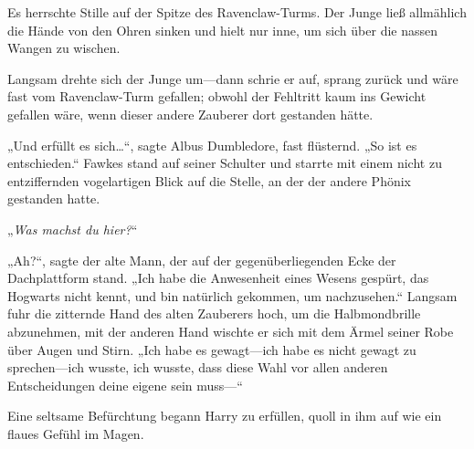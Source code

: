 Es herrschte Stille auf der Spitze des Ravenclaw-Turms. Der Junge ließ allmählich die Hände von den Ohren sinken und hielt nur inne, um sich über die nassen Wangen zu wischen.

Langsam drehte sich der Junge um—dann schrie er auf, sprang zurück und wäre fast vom Ravenclaw-Turm gefallen; obwohl der Fehltritt kaum ins Gewicht gefallen wäre, wenn dieser andere Zauberer dort gestanden hätte.

„Und erfüllt es sich…“, sagte Albus Dumbledore, fast flüsternd. „So ist es entschieden.“
Fawkes stand auf seiner Schulter und starrte mit einem nicht zu entziffernden vogelartigen Blick auf die Stelle, an der der andere Phönix gestanden hatte.

„\emph{Was machst du hier?}“

„Ah?“, sagte der alte Mann, der auf der gegenüberliegenden Ecke der Dachplattform stand. „Ich habe die Anwesenheit eines Wesens gespürt, das Hogwarts nicht kennt, und bin natürlich gekommen, um nachzusehen.“
Langsam fuhr die zitternde Hand des alten Zauberers hoch, um die Halbmondbrille abzunehmen, mit der anderen Hand wischte er sich mit dem Ärmel seiner Robe über Augen und Stirn.
„Ich habe es gewagt—ich habe es nicht gewagt zu sprechen—ich wusste, ich wusste, dass diese Wahl vor allen anderen Entscheidungen deine eigene sein muss—“

Eine seltsame Befürchtung begann Harry zu erfüllen, quoll in ihm auf wie ein flaues Gefühl im Magen.

